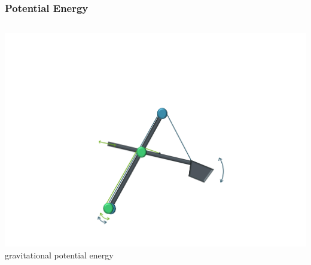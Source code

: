 \begin{frame}
	\frametitle{Potential Energy}
	\begin{columns}
			\centering
			\includegraphics[trim=30cm 5cm 30cm 23cm, clip=true, width=\linewidth]{img/Excavator_Only}
			gravitational potential energy
	\end{columns}
\end{frame}


